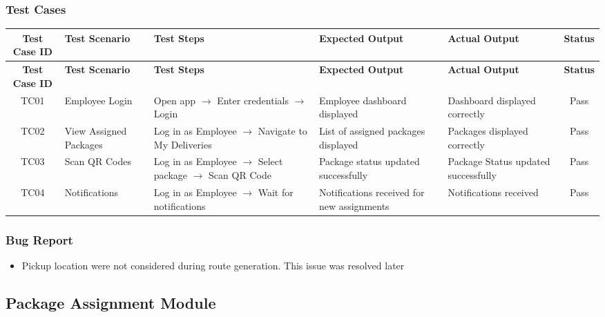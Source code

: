 \documentclass{article}
\begin{document}
\subsubsection{Test Cases}
\small
\setlength\LTleft{0pt}
\setlength\LTright{0pt}
\begin{longtable}{|c|p{2.8cm}|p{4cm}|p{2.8cm}|p{2.8cm}|c|}
\hline
\textbf{Test Case ID} & \textbf{Test Scenario} & \textbf{Test Steps} & \textbf{Expected Output} & \textbf{Actual Output} & \textbf{Status} \\
\hline
\endfirsthead
\hline
\textbf{Test Case ID} & \textbf{Test Scenario} & \textbf{Test Steps} & \textbf{Expected Output} & \textbf{Actual Output} & \textbf{Status} \\
\hline
\endhead
TC01 & Employee Login & Open app $\rightarrow$ Enter credentials $\rightarrow$ Login & Employee dashboard displayed & Dashboard displayed correctly & Pass \\
\hline
TC02 & View Assigned Packages & Log in as Employee $\rightarrow$ Navigate to My Deliveries & List of assigned packages displayed & Packages displayed correctly & Pass \\
\hline
TC03 & Scan QR Codes & Log in as Employee $\rightarrow$ Select package $\rightarrow$ Scan QR Code & Package status updated successfully & Package Status updated successfully & Pass \\
\hline
TC04 & Notifications & Log in as Employee $\rightarrow$ Wait for  notifications & Notifications received for new assignments & Notifications received & Pass \\
\hline
\end{longtable}

\subsubsection{Bug Report}
\begin{itemize}
    \item Pickup location were not considered during route generation. This issue was resolved later
\end{itemize}

\newpage

\subsection{Package Assignment Module}
\end{document}
